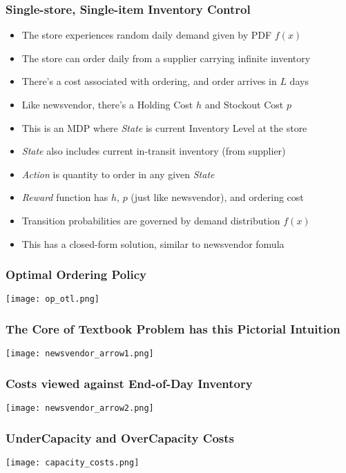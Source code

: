 \documentclass[handout]{beamer}
\begin{document}
\begin{frame}
\frametitle{Single-store, Single-item Inventory Control}
\pause
\begin{itemize}[<+->]
\item The store experiences random daily demand given by PDF $f(x)$
\item The store can order daily from a supplier carrying infinite inventory
\item There's a cost associated with ordering, and order arrives in $L$ days
\item Like newsvendor, there's a Holding Cost $h$ and Stockout Cost $p$
\item This is an MDP where {\em State} is current Inventory Level at the store
\item {\em State} also includes current in-transit inventory (from supplier)
\item {\em Action} is quantity to order in any given {\em State}
\item {\em Reward} function has $h$, $p$ (just like newsvendor), and ordering cost
\item Transition probabilities are governed by demand distribution $f(x)$
\item This has a closed-form solution, similar to newsvendor fomula
\end{itemize}
\end{frame}

\begin{frame}
\frametitle{Optimal Ordering Policy}
\texttt{[image: op\_otl.png]}
\end{frame}


\begin{frame}
\frametitle{The Core of Textbook Problem has this Pictorial Intuition}
\texttt{[image: newsvendor\_arrow1.png]}
\end{frame}


\begin{frame}
\frametitle{Costs viewed against End-of-Day Inventory}
\texttt{[image: newsvendor\_arrow2.png]}
\end{frame}

\begin{frame}
\frametitle{UnderCapacity and OverCapacity Costs}
\texttt{[image: capacity\_costs.png]}
\end{frame}
\end{document}
